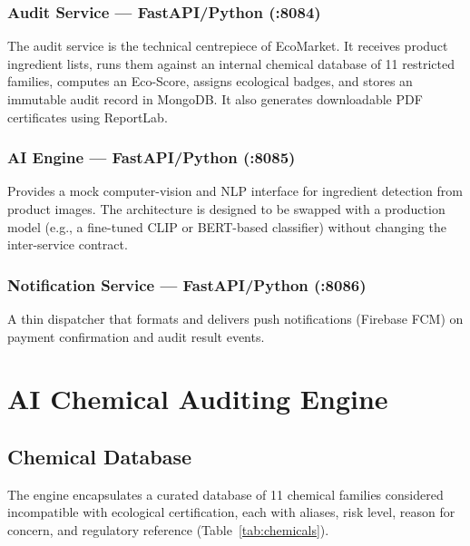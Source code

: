 \documentclass[10pt,a4paper,twocolumn]{article}
\begin{document}
\subsubsection{Audit Service — FastAPI/Python (:8084)}

The audit service is the technical centrepiece of EcoMarket.
It receives product ingredient lists, runs them against an internal
chemical database of 11 restricted families, computes an Eco-Score,
assigns ecological badges, and stores an immutable audit record in
MongoDB. It also generates downloadable PDF certificates
using ReportLab.

\subsubsection{AI Engine — FastAPI/Python (:8085)}

Provides a mock computer-vision and NLP interface for ingredient
detection from product images. The architecture is designed to be
swapped with a production model (e.g., a fine-tuned
CLIP or BERT-based classifier) without changing the inter-service
contract.

\subsubsection{Notification Service — FastAPI/Python (:8086)}

A thin dispatcher that formats and delivers push notifications
(Firebase FCM) on payment confirmation and audit result events.

\section{AI Chemical Auditing Engine}

\subsection{Chemical Database}

The engine encapsulates a curated database of 11 chemical families
considered incompatible with ecological certification, each with
aliases, risk level, reason for concern, and regulatory reference
(Table~\ref{tab:chemicals}).
\end{document}
